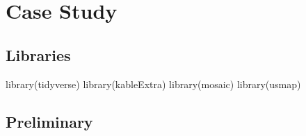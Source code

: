 \documentclass[12pt, twoside]{amherstthesis}
\newenvironment{Shaded}{\begin{snugshade}}{\end{snugshade}}
\newcommand{\FunctionTok}[1]{\textcolor[rgb]{0.00,0.00,0.00}{#1}}
\newcommand{\NormalTok}[1]{#1}
\begin{document}
\hypertarget{case-study}{%
\section{Case Study}\label{case-study}}

\hypertarget{libraries-1}{%
\subsection{Libraries}\label{libraries-1}}
\begin{Shaded}
\begin{Highlighting}[]
\FunctionTok{library}\NormalTok{(tidyverse)}
\FunctionTok{library}\NormalTok{(kableExtra)}
\FunctionTok{library}\NormalTok{(mosaic)}
\FunctionTok{library}\NormalTok{(usmap)}
\end{Highlighting}
\end{Shaded}
\hypertarget{preliminary}{%
\subsection{Preliminary}\label{preliminary}}
\end{document}
